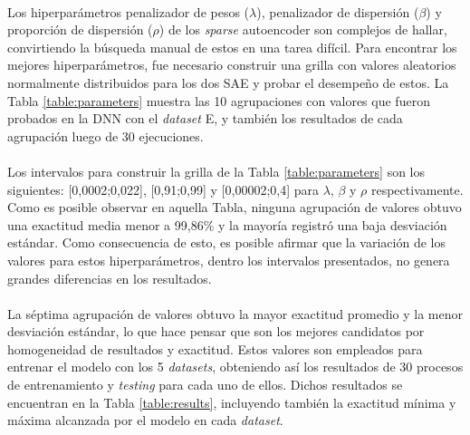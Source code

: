 \documentclass[12pt]{article}%
\begin{document}
\paragraph{}
Los hiperparámetros penalizador de pesos ($\lambda$), penalizador de dispersión ($\beta$) y proporción de dispersión ($\rho$) de los \textit{sparse} autoencoder son complejos de hallar, convirtiendo la búsqueda manual de estos en una tarea difícil. Para encontrar los mejores hiperparámetros, fue necesario construir una grilla con valores aleatorios normalmente distribuidos para los dos SAE y probar el desempeño de estos. La Tabla \ref{table:parameters} muestra las 10 agrupaciones con valores que fueron probados en la DNN con el \textit{dataset} E, y también los resultados de cada agrupación luego de 30 ejecuciones.

\paragraph{}
Los intervalos para construir la grilla de la Tabla \ref{table:parameters} son los siguientes: [0,0002;0,022], [0,91;0,99] y [0,00002;0,4] para $\lambda$, $\beta$ y $\rho$ respectivamente. Como es posible observar en aquella Tabla, ninguna agrupación de valores obtuvo una exactitud media menor a 99,86\% y la mayoría registró una baja desviación estándar. Como consecuencia de esto, es posible afirmar que la variación de los valores para estos hiperparámetros, dentro los intervalos presentados, no genera grandes diferencias en los resultados.

\paragraph{}
La séptima agrupación de valores obtuvo la mayor exactitud promedio y la menor desviación estándar, lo que hace pensar que son los mejores candidatos por homogeneidad de resultados y exactitud. Estos valores son empleados para entrenar el modelo con los 5 \textit{datasets}, obteniendo así los resultados de 30 procesos de entrenamiento y \textit{testing} para cada uno de ellos. Dichos resultados se encuentran en la Tabla \ref{table:results}, incluyendo también la exactitud mínima y máxima alcanzada por el modelo en cada \textit{dataset}.
\end{document}

